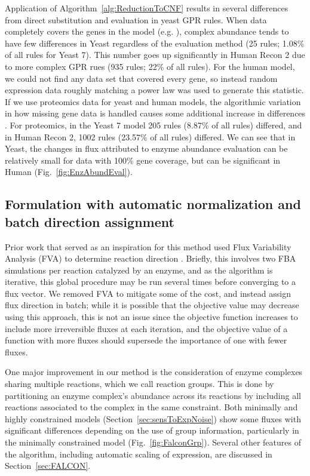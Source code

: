 Application of \suppOrApp Algorithm~\ref{alg:ReductionToCNF} results in several
differences from direct substitution and evaluation in yeast GPR
rules. When data completely covers the genes in the model
(e.g. \citealt{Lee2012}), complex abundance tends to have few differences in Yeast
regardless of the evaluation method (25 rules; 1.08\% of all rules for
Yeast 7). This number goes up significantly in Human Recon 2
\citep{Thiele2013} due to more complex GPR rues (935 rules; 22\% of
all rules). For the human model, we could not find any data set that
covered every gene, so instead random expression data roughly matching
a power law was used to generate this statistic. If we use proteomics
data for yeast and human models, the algorithmic variation in how missing gene
data is handled causes some additional increase in differences
\citep{Picotti2013,Gholami2013}.  For proteomics, in the Yeast 7 model
205 rules (8.87\% of all rules) differed, and in Human Recon 2, 1002
rules (23.57\% of all rules) differed. We can see that in Yeast, the
changes in flux attributed to enzyme abundance evaluation can be
relatively small for data with 100\% gene coverage, but can be 
significant in Human (\suppOrApp Fig.~\ref{fig:EnzAbundEval}).

%
%


\subsection{Formulation with automatic normalization and batch direction assignment}

Prior work that served as an inspiration for this method used Flux
Variability Analysis (FVA) to determine reaction direction
\citep{Lee2012}. Briefly, this involves two FBA simulations per
reaction catalyzed by an enzyme, and as the algorithm is iterative,
this global procedure may be run several times before converging to a
flux vector. We removed FVA to mitigate some
of the cost, and instead assign flux direction in batch; while it is
possible that the objective value may decrease using this approach,
this is not an issue since the objective function increases to include
more irreversible fluxes at each iteration, and the objective value of
a function with more fluxes should supersede the importance of one
with fewer fluxes.

One major improvement in our method is the consideration of enzyme
complexes sharing multiple reactions, which we call reaction groups.
This is done by partitioning an enzyme complex's abundance across
its reactions by including all reactions associated to the complex
in the same constraint.
Both minimally and highly constrained models
(Section~\ref{sec:sensToExpNoise}) show some fluxes with significant
differences depending on the use of group information, particularly in
the minimally constrained model (Fig.~\ref{fig:FalconGrp}). Several
other features of the algorithm, including automatic scaling of
expression, are discussed in \suppOrApp Section~\ref{sec:FALCON}.


